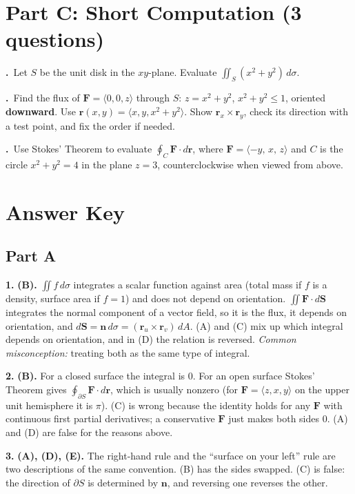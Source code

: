 \documentclass[11pt]{article}
\newcommand{\bF}{\mathbf{F}}
\newcommand{\br}{\mathbf{r}}
\newcommand{\bn}{\mathbf{n}}
\newcommand{\dA}{\,dA}
\newcounter{qn}
\newcommand{\Q}{\par\vspace{6pt}\stepcounter{qn}\textbf{\theqn.}\ }
\begin{document}
\section*{Part C: Short Computation (3 questions)}

\Q Let $S$ be the unit disk in the $xy$-plane. Evaluate $\iint_S(x^2+y^2)\,d\sigma$.

\Q Find the flux of $\bF=\langle0,0,z\rangle$ through $S$: $z=x^2+y^2$, $x^2+y^2\le1$, oriented \textbf{downward}. Use $\br(x,y)=\langle x,y,x^2+y^2\rangle$. Show $\br_x\times\br_y$, check its direction with a test point, and fix the order if needed.

\Q Use Stokes' Theorem to evaluate $\oint_C\bF\cdot d\br$, where $\bF=\langle-y,\,x,\,z\rangle$ and $C$ is the circle $x^2+y^2=4$ in the plane $z=3$, counterclockwise when viewed from above.

\newpage
\section*{Answer Key}

\subsection*{Part A}

\textbf{1.} \textbf{(B).} $\iint f\,d\sigma$ integrates a scalar function against area (total mass if $f$ is a density, surface area if $f=1$) and does not depend on orientation. $\iint\bF\cdot d\mathbf{S}$ integrates the normal component of a vector field, so it is the flux, it depends on orientation, and $d\mathbf{S}=\bn\,d\sigma=(\br_u\times\br_v)\dA$. (A) and (C) mix up which integral depends on orientation, and in (D) the relation is reversed. \emph{Common misconception:} treating both as the same type of integral.

\textbf{2.} \textbf{(B).} For a closed surface the integral is $0$. For an open surface Stokes' Theorem gives $\oint_{\partial S}\bF\cdot d\br$, which is usually nonzero (for $\bF=\langle z,x,y\rangle$ on the upper unit hemisphere it is $\pi$). (C) is wrong because the identity holds for any $\bF$ with continuous first partial derivatives; a conservative $\bF$ just makes both sides $0$. (A) and (D) are false for the reasons above.

\textbf{3.} \textbf{(A), (D), (E).} The right-hand rule and the ``surface on your left'' rule are two descriptions of the same convention. (B) has the sides swapped. (C) is false: the direction of $\partial S$ is determined by $\bn$, and reversing one reverses the other.
\end{document}
